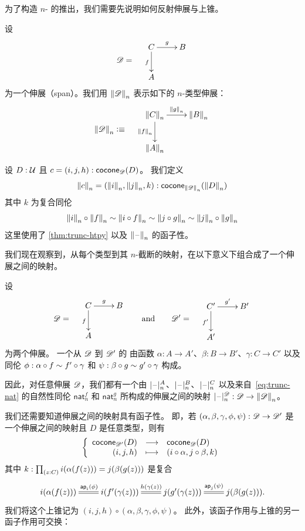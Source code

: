 为了构造 $n$-\type{} 的推出，我们需要先说明如何反射伸展与上锥。

\bgroup
\def\reflect(#1){\trunc n{#1}}

\begin{defn}
  设
  \[\Ddiag=\quad\vcenter{\xymatrix{C \ar^g[r] \ar_f[d] & B \\ A & }}\]
  为一个伸展（span）。我们用 $\reflect(\Ddiag)$ 表示如下的 $n$-类型伸展：
  \[\reflect(\Ddiag)\defeq\quad \vcenter{\xymatrix{\reflect(C) \ar^{\reflect(g)}[r]
      \ar_{\reflect(f)}[d] & \reflect(B) \\ \reflect(A) & }}\]
\end{defn}

\begin{defn}
  设 $D:\type$ 且 $c=(i,j,h):\cocone{\Ddiag}{D}$。
  我们定义
  \[\reflect(c)=(\reflect(i),\reflect(j),k):
  \cocone{\reflect(\Ddiag)}{\reflect(D)}\]
  其中 $k$ 为复合同伦
  \[ \reflect(i) \circ \reflect(f) \htpy \reflect(i\circ f) \htpy \reflect(j\circ g) \htpy \reflect(j) \circ \reflect(g) \]
  这里使用了 \cref{thm:trunc-htpy} 以及 $\reflect(\blank)$ 的函子性。
\end{defn}

\egroup

我们现在观察到，从每个类型到其 $n$-截断的映射，在以下意义下组合成了一个伸展之间的映射。

\begin{defn}
  设
  \[\Ddiag=\quad\vcenter{\xymatrix{C \ar^g[r] \ar_f[d] & B \\ A & }}
  \qquad\text{and}\qquad
  \Ddiag'=\quad\vcenter{\xymatrix{C' \ar^{g'}[r] \ar_{f'}[d] & B' \\ A' & }}
  \]
  为两个伸展。
  一个从 $\Ddiag$ 到 $\Ddiag'$ 的
  由函数 $\alpha:A\to A'$、$\beta:B\to B'$、$\gamma:C\to C'$ 以及同伦 $\phi: \alpha\circ f \htpy f'\circ \gamma$ 和 $\psi:\beta\circ g \htpy g' \circ \gamma$ 构成。
\end{defn}

因此，对任意伸展 $\Ddiag$，我们都有一个由 $\tprojf[A]n$、$\tprojf[B]n$、$\tprojf[C]n$ 以及来自~\eqref{eq:trunc-nat} 的自然性同伦 $\mathsf{nat}^f_n$ 和 $\mathsf{nat}^g_n$ 所构成的伸展之间的映射 $\tprojf[\Ddiag] n : \Ddiag \to \trunc n\Ddiag$。

我们还需要知道伸展之间的映射具有函子性。
即，若 $(\alpha,\beta,\gamma,\phi,\psi):\Ddiag \to \Ddiag'$ 是一个伸展之间的映射且 $D$ 是任意类型，则有
\[ \function{\cocone{\Ddiag'}{D}}{\cocone{\Ddiag}{D}}{(i,j,h)}{(i\circ \alpha,j\circ\beta, k)} \]
其中 $k: \prd{z:C} i(\alpha(f(z))) = j(\beta(g(z)))$ 是复合
\begin{equation}\label{eq:mapofspans-htpy}
\xymatrix{
  i(\alpha(f(z))) \ar@{=}[r]^{\apfunc{i}(\phi)} &
  i(f'(\gamma(z))) \ar@{=}[r]^{h(\gamma(z))} &
  j(g'(\gamma(z))) \ar@{=}[r]^{\apfunc{j}(\psi)} &
  j(\beta(g(z))). }
\end{equation}
我们将这个上锥记为 $(i,j,h) \circ (\alpha,\beta,\gamma,\phi,\psi)$。
此外，该函子作用与上锥的另一函子作用可交换：

